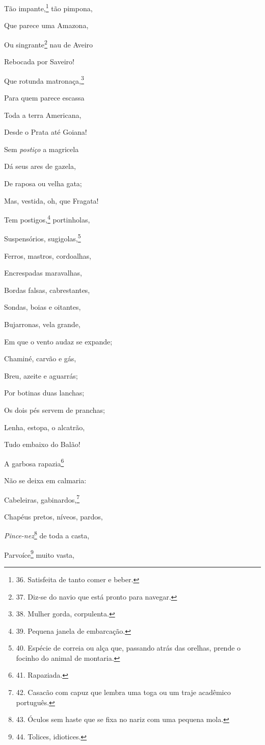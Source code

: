 Tão impante,\footnote{36. Satisfeita de tanto comer e beber.} tão
pimpona,

Que parece uma Amazona,

Ou singrante\footnote{37. Diz-se do navio que está pronto para navegar.}
nau de Aveiro

Rebocada por Saveiro!

Que rotunda matronaça,\footnote{38. Mulher gorda, corpulenta.}

Para quem parece escassa

Toda a terra Americana,

Desde o Prata até Goiana!

Sem \emph{postiço} a magricela

Dá seus ares de gazela,

De raposa ou velha gata;

Mas, vestida, oh, que Fragata!

Tem postigos,\footnote{39. Pequena janela de embarcação.} portinholas,

Suspensórios, sugigolas,\footnote{40. Espécie de correia ou alça que,
  passando atrás das orelhas, prende o focinho do animal de montaria.}

Ferros, mastros, cordoalhas,

Encrespadas maravalhas,

Bordas falsas, cabrestantes,

Sondas, boias e oitantes,

Bujarronas, vela grande,

Em que o vento audaz se expande;

Chaminé, carvão e gás,

Breu, azeite e aguarrás;

Por botinas duas lanchas;

Os dois pés servem de pranchas;

Lenha, estopa, o alcatrão,

Tudo embaixo do Balão!

A garbosa rapazia\footnote{41. Rapaziada.}

Não se deixa em calmaria:

Cabeleiras, gabinardos,\footnote{42. Casacão com capuz que lembra uma
  toga ou um traje acadêmico português.}

Chapéus pretos, níveos, pardos,

\emph{Pince-nez}\footnote{43. Óculos sem haste que se fixa no nariz com
  uma pequena mola.} de toda a casta,

Parvoíce\footnote{44. Tolices, idiotices.} muito vasta,

